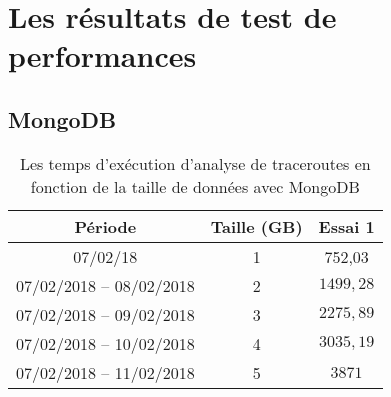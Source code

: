 \chapter{Les résultats de test de performances}

\section{MongoDB}
\begin{table}[H]
\captionsetup{justification=centering}
	\begin{tabular}{ccc}
	Période&Taille (GB)&Essai 1 \\ \hline
	07/02/18&1 &752,03 \\ \hline
	07/02/2018 – 08/02/2018& 2&$ 1499,28 $\\ \hline
	07/02/2018 – 09/02/2018&3&$ 2275,89 $\\ \hline
	07/02/2018 – 10/02/2018&4&$ 3035,19 $\\ \hline
	07/02/2018 – 11/02/2018&5&$ 3871 $\\ \hline
	\end{tabular}
    \caption{Les temps d'exécution d'analyse de traceroutes en fonction de la taille de données avec MongoDB}
    \label{tab:mongotiming-timing}
\end{table}


%	
%		
